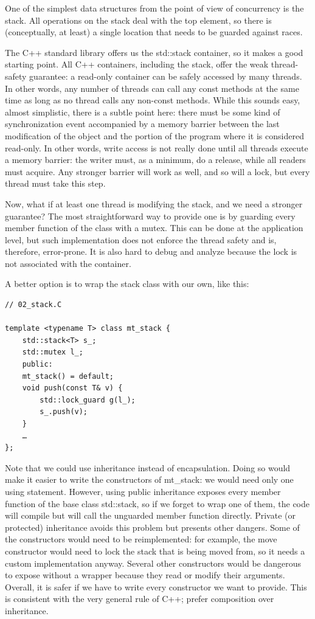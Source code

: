 
One of the simplest data structures from the point of view of concurrency is the stack. All operations on the stack deal with the top element, so there is (conceptually, at least) a single location that needs to be guarded against races.

The C++ standard library offers us the std::stack container, so it makes a good starting point. All C++ containers, including the stack, offer the weak thread-safety guarantee: a read-only container can be safely accessed by many threads. In other words, any number of threads can call any const methods at the same time as long as no thread calls any non-const methods. While this sounds easy, almost simplistic, there is a subtle point here: there must be some kind of synchronization event accompanied by a memory barrier between the last modification of the object and the portion of the program where it is considered read-only. In other words, write access is not really done until all threads execute a memory barrier: the writer must, as a minimum, do a release, while all readers must acquire. Any stronger barrier will work as well, and so will a lock, but every thread must take this step.


Now, what if at least one thread is modifying the stack, and we need a stronger guarantee? The most straightforward way to provide one is by guarding every member function of the class with a mutex. This can be done at the application level, but such implementation does not enforce the thread safety and is, therefore, error-prone. It is also hard to debug and analyze because the lock is not associated with the container. 

A better option is to wrap the stack class with our own, like this:

\begin{lstlisting}[style=styleCXX]
// 02_stack.C

template <typename T> class mt_stack {
	std::stack<T> s_;
	std::mutex l_;
	public:
	mt_stack() = default;
	void push(const T& v) {
		std::lock_guard g(l_);
		s_.push(v);
	}
	…
};
\end{lstlisting}

Note that we could use inheritance instead of encapsulation. Doing so would make it easier to write the constructors of mt\_stack: we would need only one using statement. However, using public inheritance exposes every member function of the base class std::stack, so if we forget to wrap one of them, the code will compile but will call the unguarded member function directly. Private (or protected) inheritance avoids this problem but presents other dangers. Some of the constructors would need to be reimplemented: for example, the move constructor would need to lock the stack that is being moved from, so it needs a custom implementation anyway. Several other constructors would be dangerous to expose without a wrapper because they read or modify their arguments. Overall, it is safer if we have to write every constructor we want to provide. This is consistent with the very general rule of C++; prefer composition over inheritance.

